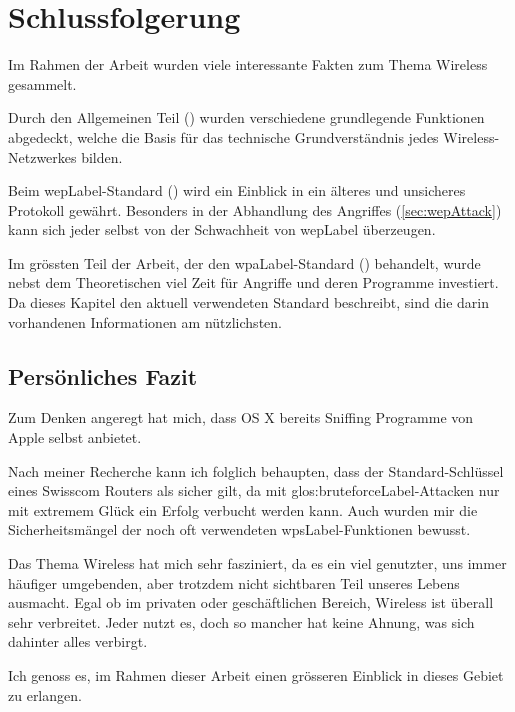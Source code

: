 \chapter{Schlussfolgerung}

Im Rahmen der Arbeit wurden viele interessante Fakten zum Thema Wireless gesammelt.

Durch den Allgemeinen Teil () wurden verschiedene grundlegende Funktionen abgedeckt, welche die Basis für das technische Grundverständnis jedes Wireless-Netzwerkes bilden.

Beim \gls{wepLabel}-Standard () wird ein Einblick in ein älteres und unsicheres Protokoll gewährt.
Besonders in der Abhandlung des Angriffes (\cref{sec:wepAttack}) kann sich jeder selbst von der Schwachheit von \gls{wepLabel} überzeugen.

Im grössten Teil der Arbeit, der den \gls{wpaLabel}-Standard () behandelt, wurde nebst dem Theoretischen viel Zeit für Angriffe und deren Programme investiert.
Da dieses Kapitel den aktuell verwendeten Standard beschreibt, sind die darin vorhandenen Informationen am nützlichsten.


\section{Persönliches Fazit}
Zum Denken angeregt hat mich, dass OS X bereits Sniffing Programme von Apple selbst anbietet.

Nach meiner Recherche kann ich folglich behaupten, dass der Standard-Schlüssel eines Swisscom Routers als sicher gilt, da mit \gls{glos:bruteforceLabel}-Attacken nur mit extremem Glück ein Erfolg verbucht werden kann.
Auch wurden mir die Sicherheitsmängel der noch oft verwendeten \gls{wpsLabel}-Funktionen bewusst.

Das Thema Wireless hat mich sehr fasziniert, da es ein viel genutzter, uns immer häufiger umgebenden, aber trotzdem nicht sichtbaren Teil unseres Lebens ausmacht.
Egal ob im privaten oder geschäftlichen Bereich, Wireless ist überall sehr verbreitet.
Jeder nutzt es, doch so mancher hat keine Ahnung, was sich dahinter alles verbirgt.

Ich genoss es, im Rahmen dieser Arbeit einen grösseren Einblick in dieses Gebiet zu erlangen.
